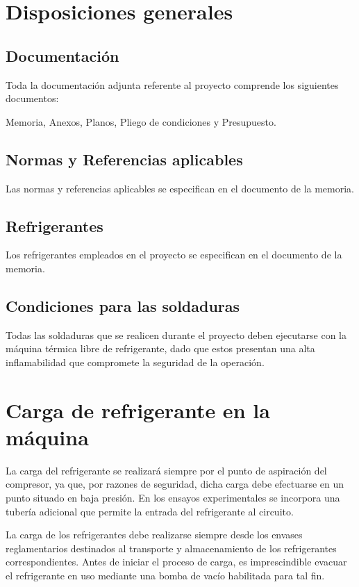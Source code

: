 \documentclass[../main.tex]{subfiles}
\begin{document}
\section{Disposiciones generales}

\subsection{Documentación}

Toda la documentación adjunta referente al proyecto comprende los siguientes documentos:

Memoria, Anexos, Planos, Pliego de condiciones y Presupuesto.

\subsection{Normas y Referencias aplicables}

Las normas y referencias aplicables se especifican en el documento de la memoria.

\subsection{Refrigerantes}

Los refrigerantes empleados en el proyecto se especifican en el documento de la memoria.

\subsection{Condiciones para las soldaduras}

Todas las soldaduras que se realicen durante el proyecto deben ejecutarse con la máquina térmica libre de refrigerante, dado que estos presentan una alta inflamabilidad que compromete la seguridad de la operación.

\newpage

\section{Carga de refrigerante en la máquina}

La carga del refrigerante se realizará siempre por el punto de aspiración del compresor, ya que, por razones de seguridad, dicha carga debe efectuarse en un punto situado en baja presión. En los ensayos experimentales se incorpora una tubería adicional que permite la entrada del refrigerante al circuito.

La carga de los refrigerantes debe realizarse siempre desde los envases reglamentarios destinados al transporte y almacenamiento de los refrigerantes correspondientes. Antes de iniciar el proceso de carga, es imprescindible evacuar el refrigerante en uso mediante una bomba de vacío habilitada para tal fin.
\end{document}
